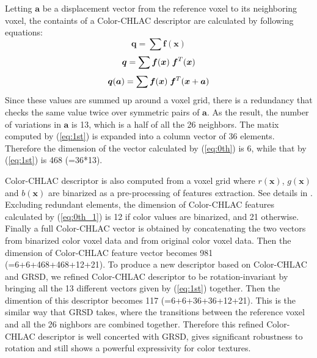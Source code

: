 \documentclass[conference]{sty/IEEEtran}
\begin{document}
%
Letting ${\bm a}$ be a displacement vector from the reference voxel to its neighboring voxel, 
   the containts of a Color-CHLAC descriptor are calculated by following equations:
\begin{equation}\label{eq:0th}
  {\bm q} = \sum \bm{f}({\bm x})
\end{equation}
\begin{equation}\label{eq:0th_1}
  {\bm q} = \sum \bm{f}({\bm x}) \hspace{1mm}\bm{f}^T({\bm x}) \\
\end{equation}
\begin{equation}\label{eq:1st}
  {\bm q}({\bm a}) = \sum \bm{f}({\bm x}) \hspace{1mm}\bm{f}^T({\bm x}+{\bm a}) \\
\end{equation}
%
Since these values are summed up around a voxel grid, there is a redundancy that checks the same value twice over symmetric pairs of ${\bm a}$. 
As the result, the number of variations in ${\bm a}$ is 13, which is a half of all the 26 neighbors.
The matix computed by (\ref{eq:1st}) is expanded into a column vector of 36 elements.
Therefore the dimension of the vector calculated by (\ref{eq:0th}) is 6, while that by (\ref{eq:1st}) is 468 (=36*13).
 
 Color-CHLAC descriptor is also computed from a voxel grid where $r(\bm{x})$, $g(\bm{x})$ and $b(\bm{x})$ are binarized as a pre-processing of features extraction. See details in \cite{kanezaki2010icra}. 
 Excluding redundant elements, the dimension of Color-CHLAC features calculated by (\ref{eq:0th_1}) is 12 if color values are binarized, and 21 otherwise. 
 Finally a full Color-CHLAC vector is obtained by concatenating the two vectors from binarized color voxel data and from original color voxel data. 
 Then the dimension of Color-CHLAC feature vector becomes 981 (=6+6+468+468+12+21).
 To produce a new descriptor based on Color-CHLAC and GRSD, we refined Color-CHLAC descriptor to be rotation-invariant by bringing all the 13 different vectors given by (\ref{eq:1st}) together. 
 Then the dimention of this descriptor becomes 117 (=6+6+36+36+12+21). 
 This is the similar way that GRSD takes, where the transitions between the reference voxel and all the 26 nighbors are combined together. 
 Therefore this refined Color-CHLAC descriptor is well concerted with GRSD, gives significant robustness to rotation and still shows a powerful expressivity for color textures.
\end{document}
